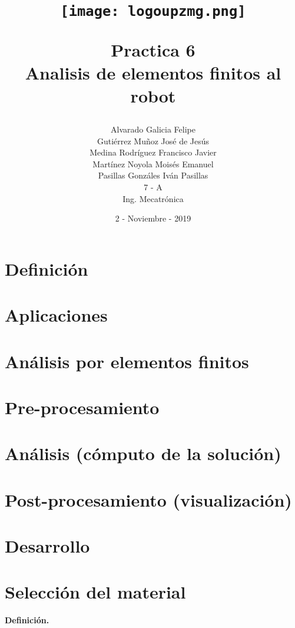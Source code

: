 \documentclass[a4paper,10pt]{article}
\title{\begin{center}
\texttt{[image: logoupzmg.png]}
\end{center}
Practica 6 \\ Analisis de elementos finitos al robot}
\author{Alvarado Galicia Felipe \\
Gutiérrez Muñoz José de Jesús \\ 
Medina Rodríguez Francisco Javier \\
Martínez Noyola Moisés Emanuel \\ 
Pasillas Gonzáles Iván Pasillas \\ 
7 - A \\ 
Ing. Mecatrónica}
\date{2 - Noviembre - 2019}
\begin{document}
\maketitle

\break

\tableofcontents

\chapter{Definición}

\hfill

\chapter{Aplicaciones}

\hfill

\chapter{Análisis por elementos finitos}

\hfill

\chapter{Pre-procesamiento}

\hfill

\chapter{Análisis (cómputo de la solución)}

\hfill

\chapter{Post-procesamiento (visualización)}

\hfill

\chapter{Desarrollo}

\hfill

\chapter{Selección del material}

\break

\textbf{Definición.}
\end{document}
